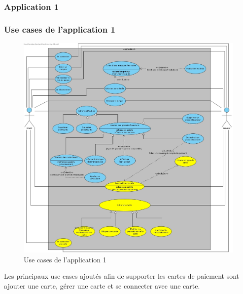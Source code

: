 \documentclass[../rapport.tex]{subfiles}
\begin{document}
\subsubsection{Application 1}

\subsubsection{Use cases de l'application 1}
	\begin{figure}[h!]
		\centering\includegraphics[scale=0.15]{ressources/photos_diagrammes/extensionTheo/diagrams1/useCases1.jpg}
		\caption{Use cases de l'application 1}
	\end{figure}

Les principaux use cases ajoutés afin de supporter les cartes de paiement sont ajouter une carte, gérer une carte et se connecter avec une carte.
\end{document}
